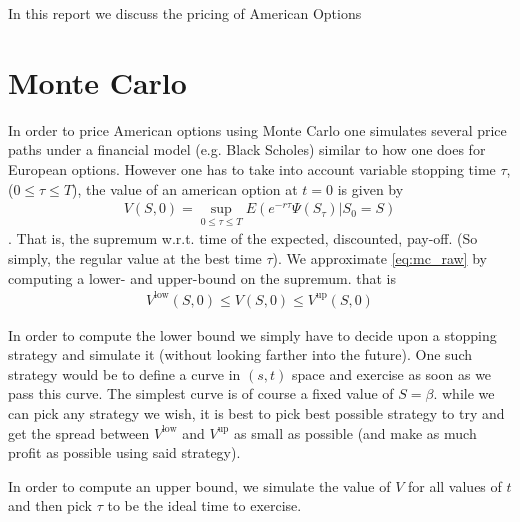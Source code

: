 

  In this report we discuss the pricing of American Options
  \section{Monte Carlo}
In order to price American options using Monte Carlo one simulates several price paths under a financial model (e.g. Black Scholes) similar to how one does for European options.
However one has to take into account variable stopping time $\tau$, ($0 \leq \tau \leq T$), the value of an american option at $t=0$ is given by
\begin{align}
  \label{eq:mc_raw}
  V(S, 0) = \sup_{0\leq \tau \leq T} E(e^{-r\tau}\Psi(S_\tau)|S_0 = S)
\end{align}.
That is, the supremum w.r.t. time of the expected, discounted, pay-off. (So simply, the regular value at the best time $\tau$).
We approximate \eqref{eq:mc_raw} by computing a lower- and upper-bound on the supremum.
that is
\begin{align}
  V^\text{low}(S,0) \leq V(S,0) \leq V^\text{up}(S,0)
\end{align}
\par In order to compute the lower bound we simply have to decide upon a stopping strategy and simulate it (without looking farther into the future).
One such strategy would be to define a curve in $(s,t)$ space and exercise as soon as we pass this curve. The simplest curve is of course a fixed value of $S = \beta$.
while we can pick any strategy we wish, it is best to pick best possible strategy to try and get the spread between $V^\text{low}$ and $V^\text{up}$ as small as possible (and make as much profit as possible using said strategy).
\par In order to compute an upper bound, we simulate the value of $V$ for all values of $t$ and then pick $\tau$ to be the ideal time to exercise.
